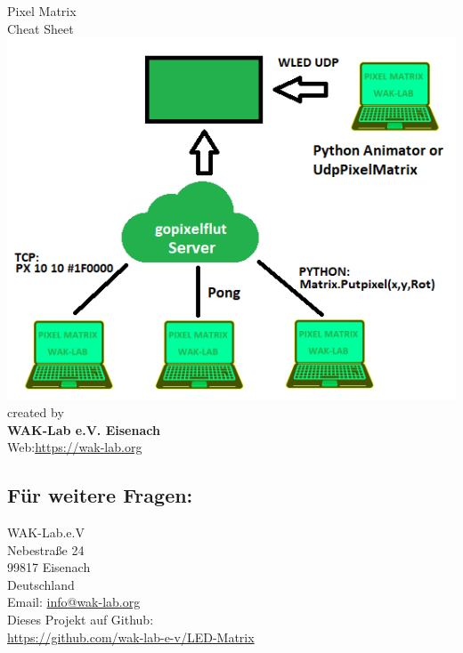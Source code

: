 


\begin{center}
	{\Large Pixel Matrix} \\[.3cm]
	{\huge {Cheat Sheet}}\\ [.3cm]
	\includegraphics[width=\linewidth, angle=0, scale=1.0]{pictures/Overview.png}\\
	\label{fig:Pinout}
	\vfill
	created by\\ 
	\textbf{WAK-Lab e.V. Eisenach}\\
	Web:\url{https://wak-lab.org}
\end{center}


\subsection{\large{Für weitere Fragen:}}
WAK-Lab.e.V\\
Nebestraße 24\\
99817 Eisenach\\
Deutschland\\
Email:  \url{info@wak-lab.org}\\
Dieses Projekt auf Github: \\
\url{https://github.com/wak-lab-e-v/LED-Matrix}
\newpage
\vspace*{\fill}
\begin{center}
\end{center}
\vspace*{\fill}



